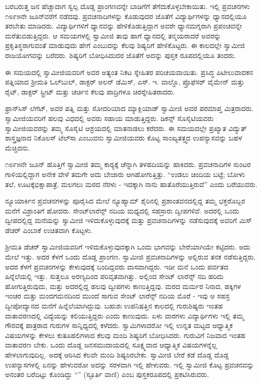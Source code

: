  ಬರಬರುತ್ತ ಜನ ಹೆಚ್ಚಾದಾಗ ಸ್ವಲ್ಪ ದೊಡ್ಡ ಪ್ರಾಂಗಣವನ್ನೇ ಬಾಡಿಗೆಗೆ ತೆಗೆದುಕೊಳ್ಳಬೇಕಾಯಿತು. ಇಲ್ಲಿ ಪ್ರವಚನಗಳು ೧೮೯೫ನೇ ಜೂನ್‍ವರೆಗೆ ನಡೆದವು. ಪ್ರವಚನಾದಿಗಳನ್ನು ಕೊಡುವುದರ ಜೊತೆಗೆ ವಿದ್ಯಾರ್ಥಿಗಳನ್ನು ಧ್ಯಾನದಲ್ಲಿಯೂ ತರಬೇತು ಮಾಡಿದರು. ವಿದ್ಯಾರ್ಥಿಗಳಿಗೆ ಧ್ಯಾನವನ್ನು ಹೇಳಿಕೊಡುತ್ತಿದ್ದಾಗ ಅವರೇ ಧ್ಯಾನಮಗ್ನರಾಗಿ ಪ್ರಪಂಚವನ್ನೇ ಮರೆತುಬಿಡುತ್ತಿದ್ದರು. ಆ ಸಮಯಗಳಲ್ಲಿ ಸ್ವಾಮೀಜಿ ತಾವು ಹಾಗೆ ಧ್ಯಾನದಲ್ಲಿ ತನ್ಮಯರಾದರೆ ಅವರನ್ನು ಪ್ರಕೃತಿಸ್ಥರಾಗುವಂತೆ ಮಾಡುವುದು ಹೇಗೆ ಎಂಬುದನ್ನು ಕೆಲವು ಶಿಷ್ಯರಿಗೆ ಹೇಳಿಕೊಟ್ಟರು. ಈ ಕಾಲದಲ್ಲೇ ಸ್ವಾಮೀಜಿ ರಾಜಯೋಗವನ್ನು ಬರೆದರು. ಶಿಷ್ಯರಿಗೆ ಬೋಧಿಸಿದುದರ ಜೊತೆಗೆ ಅದನ್ನು ಪುಸ್ತಕ ರೂಪದಲ್ಲಿಯೂ ತಂದರು. 

 ಈ ಸಮಯದಲ್ಲಿ ಸ್ವಾಮೀಜಿಯವರಿಗೆ ಅವರ ಅತ್ಯಂತ ನಿಕಟ ಸ್ನೇಹಿತರ ಪರಿಚಯವಾಯಿತು. ಪ್ರಸಿದ್ಧ ಪಿಟೀಲುವಾದಕನ ಪತ್ನಿಯಾದ ಶ‍್ರೀಮತಿ ಓಲ್‍ಬುಲ್, ಡಾಕ್ಟರ್ ಅಲನ್ ಡೆಮಿಸ್, ಎಸ್. ಇ. ವಾಲ್ಡೊ, ಪ್ರೊಫೆಸರ್ ವೈಮೇನ್ ಮತ್ತು ರೈಟ್, ಡಾಕ್ಟರ್ ಸ್ಟ್ರೀಟ್ ಮತ್ತು ಚರ್ಚಿನ ಕೆಲವು ಪಾದ್ರಿಗಳೂ ಚಿರಸ್ನೇಹಿತರಾದರು. 

 ಫ್ರಾನ್‍ಸಿಸ್ ಲೆಗೆಟ್, ಅವರ ಪತ್ನಿ ಮತ್ತು ಸೋದರಿಯಾದ ಮ್ಯಾಕ್ಲಿಯಾಡ್ ಸ್ವಾಮೀಜಿ ಅವರ ಪರಮಾಪ್ತ ಮಿತ್ರರಾದರು. ಸ್ವಾಮೀಜಿಯವರಿಗೆ ಹಲವು ವಿಧದಲ್ಲಿ ಅವರು ಸಹಾಯ ಮಾಡುತ್ತಿದ್ದರು. ಡಿಕನ್ಸ್ ಸೊಸೈಟಿಯವರು ಸ್ವಾಮೀಜಿಯವರನ್ನು ತಮ್ಮ ಸೊಸೈಟಿ ಆಶ್ರಯದಲ್ಲಿ ಮಾತನಾಡಲು ಕರೆದರು. ಈ ಸಮಯದಲ್ಲೇ ಪ್ರಖ್ಯಾತ ವಿದ್ಯುತ್ ಶಾಸ್ತ್ರಜ್ಞನಾದ ನಿಕೊಲಸ್ ಟೆಲ್‍ಸಾ ಎಂಬುವನು ಸ್ವಾಮೀಜಿಯವರು ಕೊಟ್ಟ ಸಾಂಖ್ಯತತ್ತ್ವದ ಉಪನ್ಯಾಸವನ್ನು ಬಹಳ ಮೆಚ್ಚಿದನು. 

 ೧೮೯೫ನೇ ಜೂನ್ ಹೊತ್ತಿಗೆ ಸ್ವಾಮೀಜಿ ತಮ್ಮ ಕಾರ‍್ಯಕ್ಕೆ ಚೆನ್ನಾಗಿ ತಳಹದಿಯನ್ನು ಹಾಕಿದರು. ಪ್ರವಚನಾದಿಗಳ ಸುಂಟರ ಗಾಳಿಯಲ್ಲಿದ್ದಾಗ ಅನೇಕ ವೇಳೆ ತಮಗೇ ಅದು ಬೇಜಾರು ಆಗಿಹೋಗುತ್ತಿತ್ತು. “ಉಡಲು ಚಿಂದಿಯ ಬಟ್ಟೆ; ಬೋಳು ತಲೆ, ಊಟಕ್ಕೆ\break ಭಿಕ್ಷಾಪಾತ್ರೆ, ಮಲಗಲು ಮರದ ನೆರಳು - ಇದಕ್ಕಾಗಿ ನಾನು ಹಾತೊರೆಯುತ್ತಿರುವೆ” ಎಂದು ಬರೆಯುವರು. 

 ನ್ಯೂಯಾರ್ಕಿನ ಪ್ರವಚನಗಳನ್ನು ಪೂರೈಸಿದ ಮೇಲೆ ನ್ಯೂಹ್ಯಾಮ್ ಶೈರಿನಲ್ಲಿ ಪ್ರಶಾಂತವನದಲ್ಲಿದ್ದ ತಮ್ಮ ಭಕ್ತರೊಬ್ಬರ ಮನೆಗೆ ವಿಶ್ರಾಂತಿಗೆ ಹೋದರು. ಸೇಂಟ್‍ಲಾರೆನ್ಸ್ ನದಿಯ ಮಧ್ಯದಲ್ಲಿ ಸಹಸ್ರಾರು ದ್ವೀಪಗಳಿವೆ. ಅದರಲ್ಲಿ ಒಂದು ದ್ವೀಪದಲ್ಲಿದ್ದ ಮನೆಯನ್ನು ಸ್ವಾಮೀಜಿ ಇಳಿದುಕೊಳ್ಳುವುದಕ್ಕೆ ಮತ್ತು ಪ್ರವಚನಾದಿಗಳನ್ನು ನಡೆಸುವುದಕ್ಕೆ ಅವರಿಗೆ ಮಿಸ್ ಡೆಚರ್ ಎಂಬಾಕೆ ಉಚಿತವಾಗಿ ಕೊಟ್ಟಳು. 

 ಶ‍್ರೀಮತಿ ಡೆಚರ್ ಸ್ವಾಮೀಜಿಯವರಿಗೆ ಇಳಿದುಕೊಳ್ಳುವುದಕ್ಕಾಗಿ ಒಂದು ಭಾಗವನ್ನು ಬೇರೆಯಾಗಿಯೇ ಕಟ್ಟಿದರು. ಅದು ಮೇಲೆ ಇತ್ತು. ಅದರ ಕೆಳಗೆ ಒಂದು ದೊಡ್ಡ ಪ್ರಾಂಗಣ. ಸ್ವಾಮೀಜಿ ಪ್ರವಚನಾದಿಗಳನ್ನು ಅಲ್ಲಿರುವ ತನಕ ನಡೆಸುತ್ತಿದ್ದರು. ಅದರ ಕೆಳಗೆ ಪ್ರವಚನಗಳನ್ನು ಕೇಳುವುದಕ್ಕೆ ಬಂದಿದ್ದವರು ವಾಸವಾಗಿದ್ದರು. ಇಡೀ ಮನೆ ಒಂದು ಪರ್ವತದ ಹಿನ್ನೆಲೆಯಲ್ಲಿ ಇತ್ತು. ಸುತ್ತಲೂ ಅರಣ್ಯದಿಂದ ಪರಿವೃತವಾಗಿತ್ತು. ಅಲ್ಲಿಂದ ಸೇಂಟ್ ಲಾರೆನ್ಸ್ ನದಿ ಹರಿದು ಹೋಗುತ್ತಿರುವುದು, ಮತ್ತು ಅದರಲ್ಲಿದ್ದ ಹಲವು ದ್ವೀಪಗಳು ಕಾಣುತ್ತಿದ್ದವು. ಮರದ ಮರ್ಮರ ನಿನಾದ, ಹಕ್ಕಿಗಳ ಇಂಚರ ಮತ್ತು ಮಂದಗಮನದಿಂದ ಮುಂದೆ ಸಾಗುವ ಸೇಂಟ್ ಲಾರೆನ್ಸ್ ನದಿಯ ಮೊರೆ - ಇವು ಆ ಸಹಸ್ರ ದ್ವೀಪೋದ್ಯಾನದ ಮನೆಗೆ ಹಿನ್ನೆಲೆಯಾಗಿದ್ದುವು. ಬಹುಶಃ ಉಪನಿಷತ್ತಿನ ಕಾಲದಲ್ಲಿ ಗುರುಶಿಷ್ಯರು ಇಂತಹ ವಾತಾವರಣದಲ್ಲಿ ವಿದ್ಯೆಯನ್ನು ಕಲಿಯುತ್ತಿದ್ದರು ಎಂದು ಕಾಣುವುದು. ಏಳು ವಾರಗಳು ವಿದ್ಯಾರ್ಥಿಗಳು ಇಲ್ಲಿ ತಮ್ಮ ಗೌರವಕ್ಕೆ ಪಾತ್ರರಾದ ಗುರುಗಳ ಸಾನ್ನಿಧ್ಯದಲ್ಲಿ ಕಳೆದರು. ಸ್ವಾಮಿಗಳಾದರೋ ಇಲ್ಲಿ ಉನ್ನತ ಮಟ್ಟದ ಆಧ್ಯಾತ್ಮಿಕ ವಿಷಯಗಳನ್ನು ಕೇಳಲು ಕುತೂಹಲಿಗಳಾದ ಕೆಲವು ಮಂದಿ ಶಿಷ್ಯರಿಗೆ ಬೋಧಿಸಿದರು. ಗುರುವಿಗೆ ನಿಜವಾದ ಇಂತಹ ವಾತಾವರಣ ಬೇಕು. ಒಂದು ದೊಡ್ಡ ಜನಸಮುದಾಯದಲ್ಲಿ ಸೂಕ್ಷ್ಮವಾದ ಆಧ್ಯಾತ್ಮಿಕ ವಿಷಯಗಳನ್ನೆಲ್ಲ ಹೇಳಲಾಗುವುದಿಲ್ಲ. ಅದಕ್ಕೆ ಆರಿಸಿದ ಕೆಲವೇ ಮಂದಿ ಶಿಷ್ಯರಿರಬೇಕು. ಸ್ವಾಮೀಜಿ ಬೇರೆ ಕಡೆ ದೊಡ್ಡ ದೊಡ್ಡ ಉಪನ್ಯಾಸಗಳಲ್ಲಿ ಏನನ್ನು ಹೇಳುವರೋ ಅದನ್ನು ಸರಳವಾಗಿ ಇಲ್ಲಿ ಹೇಳುವರು. ಇಲ್ಲಿ ಸ್ವಾಮೀಜಿ ಕೊಟ್ಟ ಪ್ರವಚನವನ್ನು ಅನಂತರ ಬರೆದಿಟ್ಟು ಕೊಂಡಿದ್ದು “” (ಸ್ಫೂರ್ತಿ ವಾಣಿ) ಎಂಬ ಪುಸ್ತಕರೂಪದಲ್ಲಿ ಪ್ರಕಟಿಸಿರುವರು. 

